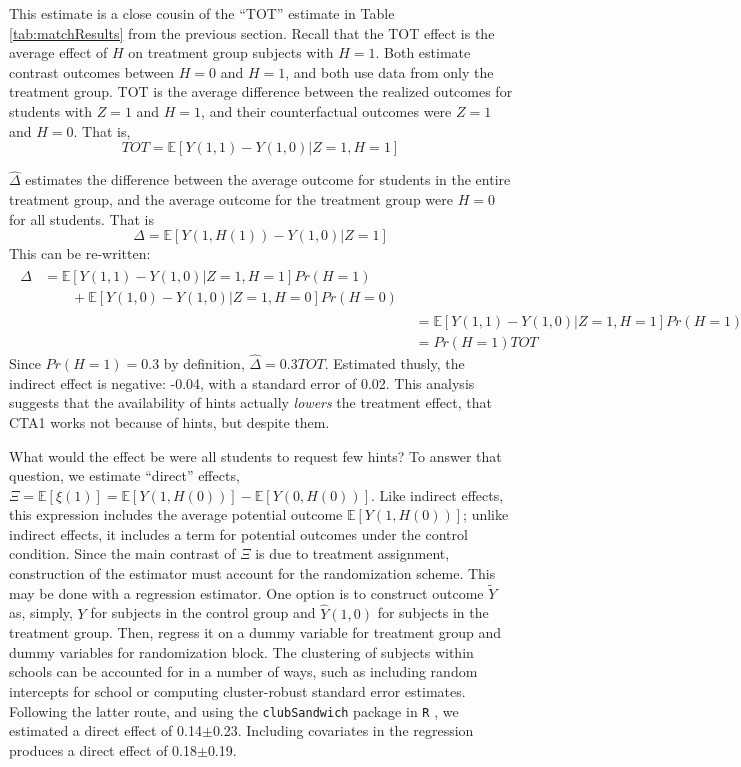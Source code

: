 \documentclass{article}\usepackage[]{graphicx}\usepackage[]{color}
\newcommand{\EE}{\mathbb{E}}
\begin{document}
This estimate is a close cousin of the ``TOT'' estimate in Table
\ref{tab:matchResults} from the previous section.
Recall that the TOT effect is the average effect of $H$ on treatment
group subjects with $H=1$.
Both estimate contrast outcomes between $H=0$ and $H=1$, and both use
data from only the treatment group.
TOT is the average difference between the realized outcomes for students
with $Z=1$ and $H=1$, and their counterfactual outcomes were $Z=1$ and $H=0$.
That is,
\begin{equation*}
TOT=\EE[Y(1,1)-Y(1,0)|Z=1,H=1]
\end{equation*}

$\hat{\Delta}$ estimates the difference between the average outcome
for students in the entire treatment group, and the average outcome
for the treatment group were $H=0$ for all students.
That is
\begin{equation*}
\Delta=\EE[Y(1,H(1))-Y(1,0)|Z=1]
\end{equation*}
This can be re-written:
\begin{align*}
\begin{split}
\Delta&=\EE[Y(1,1)-Y(1,0)|Z=1,H=1]Pr(H=1)\\
&\qquad +\EE[Y(1,0)-Y(1,0)|Z=1,H=0]Pr(H=0)
\end{split}
\\[2ex]
&=\EE[Y(1,1)-Y(1,0)|Z=1,H=1]Pr(H=1)\\
&=Pr(H=1)TOT
\end{align*}
Since $Pr(H=1)=$0.3 by definition,
$\hat{\Delta}=$0.3$TOT$.
Estimated thusly, the indirect effect is negative: -0.04, with
a standard error of 0.02.
This analysis suggests that the availability of hints
actually \emph{lowers} the treatment effect, that CTA1 works not
because of hints, but despite them.

What would the effect be were all students to request few hints?
To answer that question, we estimate ``direct'' effects,
$\Xi=\EE[\xi(1)]=\EE[Y(1,H(0))]-\EE[Y(0,H(0))]$.
Like indirect effects, this expression includes the average potential
outcome $\EE[Y(1,H(0))]$; unlike indirect effects, it includes a term for
potential outcomes under the control condition.
Since the main contrast of $\Xi$ is due to treatment assignment,
construction of the estimator must account for the randomization
scheme.
This may be done with a regression estimator.
One option is to construct outcome $\tilde{Y}$ as, simply, $Y$ for
subjects in the control group and $\hat{Y}(1,0)$ for subjects in the
treatment group.
Then, regress it on a dummy variable for treatment group and dummy
variables for randomization block.
The clustering of subjects within schools can be accounted for in a
number of ways, such as including random intercepts for school or
computing cluster-robust standard error estimates.
Following the latter route, and using the \texttt{clubSandwich}
package in \texttt{R} \citep{clubsandwich}, we estimated a direct
effect of
0.14$\pm$0.23.
Including covariates in the regression produces a direct effect of
0.18$\pm$0.19.
\end{document}
